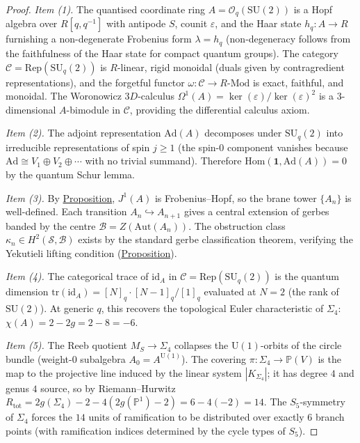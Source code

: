 \begin{proof}
\emph{Item (1).}
The quantised coordinate ring $A = \mathcal{O}_q(\mathrm{SU}(2))$ is a
Hopf algebra over $R[q, q^{-1}]$ with antipode $S$, counit $\varepsilon$,
and the Haar state $h_q \colon A \to R$ furnishing a non-degenerate
Frobenius form $\lambda = h_q$ (non-degeneracy follows from the
faithfulness of the Haar state for compact quantum groups).  The category
$\mathcal{C} = \mathrm{Rep}(\mathrm{SU}_q(2))$ is $R$-linear, rigid
monoidal (duals given by contragredient representations), and the forgetful
functor $\omega \colon \mathcal{C} \to R\text{-}\mathrm{Mod}$ is exact,
faithful, and monoidal.  The Woronowicz $3D$-calculus
$\Omega^1(A) = \ker(\varepsilon) / \ker(\varepsilon)^2$ is a
$3$-dimensional $A$-bimodule in $\mathcal{C}$, providing the differential
calculus axiom.

\emph{Item (2).}
The adjoint representation $\mathrm{Ad}(A)$ decomposes under
$\mathrm{SU}_q(2)$ into irreducible representations of spin $j \geq 1$
(the spin-$0$ component vanishes because
$\mathrm{Ad} \cong V_1 \oplus V_2 \oplus \cdots$ with no trivial
summand).  Therefore $\mathrm{Hom}(\mathbf{1}, \mathrm{Ad}(A)) = 0$ by
the quantum Schur lemma.

\emph{Item (3).}
By \hyperref[prop:jet-prolongation]{Proposition}, $J^1(A)$ is Frobenius--Hopf, so
the brane tower $\{A_n\}$ is well-defined.  Each transition
$A_n \hookrightarrow A_{n+1}$ gives a central extension of gerbes banded by
the centre $\mathcal{B} = Z(\mathrm{Aut}(A_n))$.  The obstruction class
$\kappa_n \in H^2(\mathcal{S}, \mathcal{B})$ exists by the standard gerbe
classification theorem, verifying the Yekutieli lifting condition
(\hyperref[prop:yekutieli-lifting]{Proposition}).

\emph{Item (4).}
The categorical trace of $\mathrm{id}_A$ in
$\mathcal{C} = \mathrm{Rep}(\mathrm{SU}_q(2))$ is the quantum dimension
$\mathrm{tr}(\mathrm{id}_A) = [N]_q \cdot [N-1]_q / [1]_q$ evaluated at
$N = 2$ (the rank of $\mathrm{SU}(2)$).  At generic $q$, this recovers
the topological Euler characteristic of $\Sigma_4$:
$\chi(A) = 2 - 2g = 2 - 8 = -6$.

\emph{Item (5).}
The Reeb quotient $M_S \to \Sigma_4$ collapses the $\mathrm{U}(1)$-orbits
of the circle bundle (weight-$0$ subalgebra $A_0 = A^{\mathrm{U}(1)}$).
The covering $\pi \colon \Sigma_4 \to \mathbb{P}(V)$ is the map to the
projective line induced by the linear system $|K_{\Sigma_4}|$; it has
degree $4$ and genus $4$ source, so by Riemann--Hurwitz
$R_{\mathrm{tot}} = 2g(\Sigma_4) - 2 - 4(2g(\mathbb{P}^1) - 2) =
6 - 4(-2) = 14$.
The $S_5$-symmetry of $\Sigma_4$ forces the $14$ units of ramification to
be distributed over exactly $6$ branch points (with ramification indices
determined by the cycle types of $S_5$).
\end{proof}

